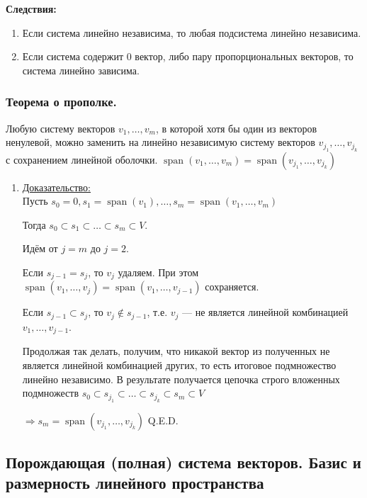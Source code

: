 \documentclass[twoside]{book}
\DeclareMathOperator{\spann}{span}
\newcommand{\prooff}[1]{{\underline{Доказательство:}} \\ }
\begin{document}
\textbf{Следствия:}

\begin{enumerate}
    \item Если система линейно независима, то любая подсистема линейно независима.

    \item Если система содержит \(0\) вектор, либо пару пропорциональных векторов, то система линейно зависима.
\end{enumerate}



\subsubsection{Теорема о прополке.}

Любую систему векторов \(v_1, \ldots, v_m\), в которой хотя бы один из векторов ненулевой, можно заменить на линейно независимую систему векторов \(v_{j_1}, \ldots, v_{j_k}\) с сохранением линейной оболочки. \(\spann (v_1, \ldots, v_m) = \spann (v_{j_1}, \ldots, v_{j_k})\)

\begin{enumerate}
    \item[] \prooff{}
          Пусть \(s_0 = 0, s_1 = \spann (v_1), \ldots, s_m = \spann (v_1, \ldots, v_m)\)

          Тогда \(s_0 \subset s_1 \subset \ldots \subset s_m \subset V\).

          Идём от \(j = m\) до \(j = 2\).

          Если \(s_{j - 1} = s_j\), то \(v_j\) удаляем. При этом \(\spann (v_1, \ldots, v_j) = \spann (v_1, \ldots, v_{j - 1})\) сохраняется.

          Если \(s_{j - 1} \subset s_j\), то \(v_j \notin s_{j - 1}\), т.е. \(v_j\) --- не является линейной комбинацией \(v_1, \ldots, v_{j - 1}\).

          Продолжая так делать, получим, что никакой вектор из полученных не является линейной комбинацией других, то есть итоговое подмножество линейно независимо. В результате получается цепочка строго вложенных подмножеств \(s_0 \subset s_{j_1} \subset \ldots \subset s_{j_k} \subset s_m \subset V \)

          \(\Rightarrow s_m = \spann (v_{j_1}, \ldots, v_{j_k})\) \hfill Q.E.D.
\end{enumerate}

\subsection{Порождающая (полная) система векторов. Базис и размерность линейного пространства}
\end{document}
